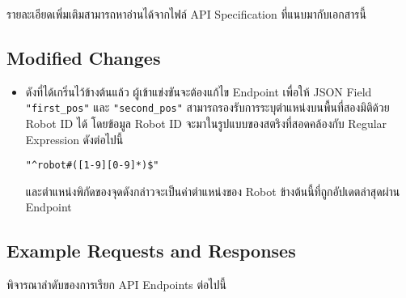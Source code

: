 \noindent        
รายละเอียดเพิ่มเติมสามารถหาอ่านได้จากไฟล์ API Specification ที่แนบมากับเอกสารนี้

\subsection{Modified Changes}

\begin{itemize}[parsep=0.5pc]
\item
    ดังที่ได้เกริ่นไว้ข้างต้นแล้ว ผู้เข้าแข่งขันจะต้องแก้ไข Endpoint  เพื่อให้ JSON Field \lstinline{"first_pos"} และ \lstinline{"second_pos"} สามารถรองรับการระบุตำแหน่งบนพื้นที่สองมิติด้วย Robot ID ได้ โดยข้อมูล Robot ID จะมาในรูปแบบของสตริงที่สอดคล้องกับ Regular Expression ดังต่อไปนี้
    \begin{center}
        \lstinline{"^robot#([1-9][0-9]*)$"}
    \end{center}
    และตำแหน่งพิกัดของจุดดังกล่าวจะเป็นค่าตำแหน่งของ Robot ข้างต้นนี้ที่ถูกอัปเดตล่าสุดผ่าน Endpoint 
\end{itemize}

\newpage
{}
\subsection{Example Requests and Responses}

\noindent
พิจารณาลำดับของการเรียก API Endpoints ต่อไปนี้

